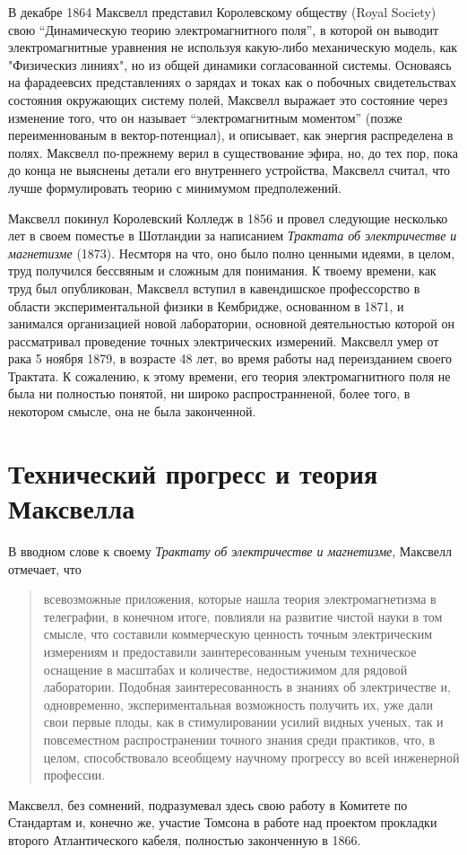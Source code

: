 \documentclass[12pt, oneside, a4paper]{article}
\begin{document}
В декабре 1864 Максвелл представил Королевскому обществу (Royal Society) свою ``Динамическую теорию электромагнитного поля'', в которой он выводит электромагнитные уравнения не используя какую-либо механическую модель, как "Физическиз линиях", но из общей динамики согласованной системы. Основаясь на фарадеевсих представлениях о зарядах и токах как о побочных свидетельствах состояния окружающих систему полей, Максвелл выражает это состояние через изменение того, что он называет ``электромагнитным моментом'' (позже переименнованым в вектор-потенциал), и описывает, как энергия распределена в полях. Максвелл по-прежнему верил в существование эфира, но, до тех пор, пока до конца не выяснены детали его внутреннего устройства, Максвелл считал, что лучше формулировать теорию с минимумом предполежений. 

Максвелл покинул Королевский Колледж в 1856 и провел следующие несколько лет в своем поместье в Шотландии за написанием  \emph{Трактата об электричестве и магнетизме} (1873). Несмторя на что, оно было полно ценными идеями, в целом, труд получился бессвяным и сложным для понимания. К твоему времени, как труд был опубликован, Максвелл вступил в кавендишское профессорство в области экспериментальной физики в Кембридже, основанном в 1871, и занимался организацией новой лаборатории, основной деятельностью которой он рассматривал проведение точных электрических измерений. Максвелл умер от рака 5 ноября 1879, в возрасте 48 лет, во время работы над переизданием своего Трактата. К сожалению, к этому времени, его теория электромагнитного поля не была ни полностью понятой, ни широко распространненой, более того, в некотором смысле, она не была законченной.

\section*{Технический прогресс и теория Максвелла}
В вводном слове к своему \emph{Трактату об электричестве и магнетизме}, Максвелл отмечает, что 
\begin{quote}
\small
всевозможные приложения, которые нашла теория электромагнетизма в телеграфии, в конечном итоге, повлияли на развитие чистой науки в том смысле, что составили коммерческую ценность точным электрическим измерениям и предоставили заинтересованным ученым техническое оснащение в масштабах и количестве, недостижимом для рядовой лаборатории. Подобная заинтересованность в знаниях об электричестве и, одновременно, экспериментальная возможность получить их, уже дали свои первые плоды, как в стимулировании усилий видных ученых, так и повсеместном распространении точного знания среди практиков, что, в целом, способствовало  всеобщему научному прогрессу во всей инженерной профессии.
\end{quote}
Максвелл, без сомнений, подразумевал здесь свою работу в Комитете по Стандартам и, конечно же, участие Томсона в работе над проектом прокладки второго Атлантического кабеля, полностью законченную в 1866.
\end{document}
